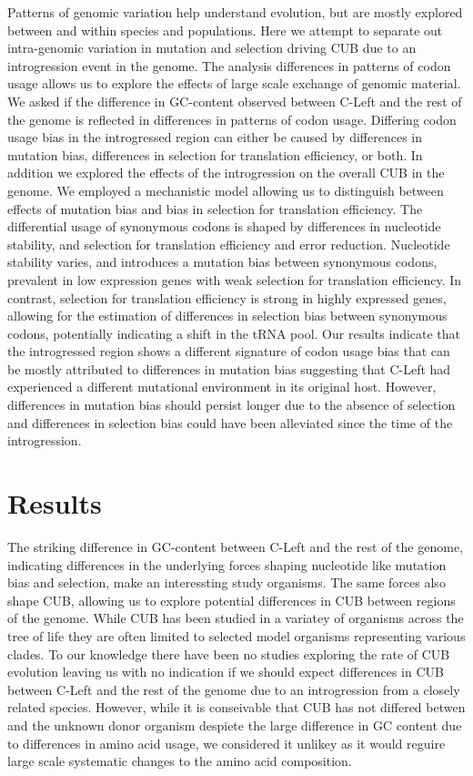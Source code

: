 \documentclass[12pt]{article}
\begin{document}
Patterns of genomic variation help understand evolution, but are mostly explored between and within species and populations.
Here we attempt to separate out intra-genomic variation in mutation and selection driving CUB due to an introgression event in the \kluyveri genome.
The analysis differences in patterns of codon usage allows us to explore the effects of large scale exchange of genomic material. 
We asked if the difference in GC-content observed between C-Left and the rest of the genome is reflected in differences in patterns of codon usage.
Differing codon usage bias in the introgressed region can either be caused by differences in mutation bias, differences in selection for translation efficiency, or both.
In addition we explored the effects of the introgression on the overall CUB in the \kluyveri genome.
We employed a mechanistic model \citep{gilchrist2015} allowing us to distinguish between effects of mutation bias and bias in selection for translation efficiency.
The differential usage of synonymous codons is shaped by differences in nucleotide stability, and selection for translation efficiency and error reduction.
Nucleotide stability varies, and introduces a mutation bias between synonymous codons, prevalent in low expression genes with weak selection for translation efficiency.
In contrast, selection for translation efficiency is strong in highly expressed genes, allowing for the estimation of differences in selection bias between synonymous codons, potentially indicating a shift in the tRNA pool.
Our results indicate that the introgressed region shows a different signature of codon usage bias that can be mostly attributed to differences in mutation bias suggesting that C-Left had experienced a different mutational environment in its original host.
However, differences in mutation bias should persist longer due to the absence of selection and differences in selection bias could have been alleviated since the time of the introgression.   
	
\section*{Results}
The striking difference in GC-content between C-Left and the rest of the \kluyveri genome, indicating differences in the underlying forces shaping nucleotide like mutation bias and selection, make \kluyveri an interessting study organisms. 
The same forces also shape CUB, allowing us to explore potential differences in CUB between regions of the \kluyveri genome.
While CUB has been studied in a variatey of organisms across the tree of life they are often limited to selected model organisms representing various clades.
To our knowledge there have been no studies exploring the rate of CUB evolution leaving us with no indication if we should expect differences in CUB between C-Left and the rest of the \kluyveri genome due to an introgression from a closely related species.
However, while it is conseivable that CUB has not differed betwen \kluyveri and the unknown donor organism despiete the large difference in GC content due to differences in amino acid usage, we considered it unlikey as it would reguire large scale systematic changes to the amino acid composition.
\end{document}
